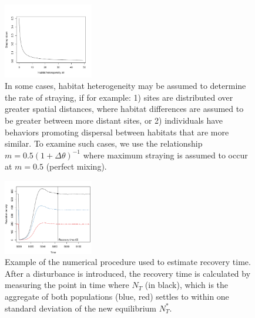 \documentclass{revtex4}
\begin{document}
\begin{figure}
  \captionsetup{justification=raggedright,
singlelinecheck=false
}
\centering
\includegraphics[width=0.35\textwidth]{fig_mthetarelation.pdf}
\caption{
In some cases, habitat heterogeneity may be assumed to determine the rate of straying, if for example:
1) sites are distributed over greater spatial distances, where habitat differences are assumed to be greater between more distant sites, or 2) individuals have behaviors promoting dispersal between habitats that are more similar. To examine such cases, we use the relationship $m= 0.5(1 + \Delta\theta)^{-1}$ where maximum straying is assumed to occur at $m=0.5$ (perfect mixing).
} \label{fig:mthetarelation}
\end{figure}


\begin{figure}
  \captionsetup{justification=raggedright,
singlelinecheck=false
}
\centering
\includegraphics[width=0.35\textwidth]{fig_recovery.pdf}
\caption{
Example of the numerical procedure used to estimate recovery time. After a disturbance is introduced, the recovery time is calculated by measuring the point in time where $N_T$ (in black), which is the aggregate of both populations (blue, red) settles to within one standard deviation of the new equilibrium $N_T^*$. 
} \label{fig:recovery}
\end{figure}
\end{document}
